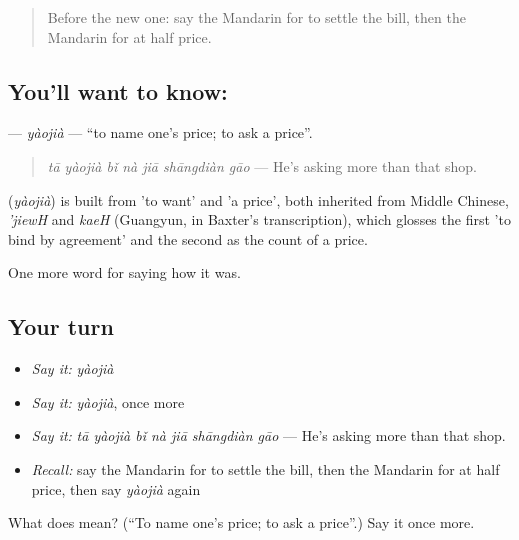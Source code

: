 \label{lesson:ZH-C524-yaojia}



\begin{quote}
Before the new one: say the Mandarin for to settle the bill, then the Mandarin for at half price.
\end{quote}

\subsection*{You'll want to know: }
\textbf{} — \emph{yàojià} — \textquotedblleft{}to name one's price; to ask a price\textquotedblright{}.

\begin{quote}
\emph{tā yàojià bǐ nà jiā shāngdiàn gāo} — He's asking more than that shop.
\end{quote}

\begin{cousinweb}
\textbf{} (\emph{yàojià}) is built from  'to want' and  'a price', both inherited from Middle Chinese, \emph{'jiewH} and \emph{kaeH} (Guangyun, in Baxter's transcription), which glosses the first 'to bind by agreement' and the second as the count of a price.
\end{cousinweb}

\begin{grammarlens}[title={What you've built}]
One more word for saying how it was.
\end{grammarlens}

\subsection*{Your turn}
\begin{itemize}
\raggedright
  \item \emph{Say it:} \emph{yàojià}
  \item \emph{Say it:} \emph{yàojià}, once more
  \item \emph{Say it:} \emph{tā yàojià bǐ nà jiā shāngdiàn gāo} — He's asking more than that shop.
  \item \emph{Recall:} say the Mandarin for to settle the bill, then the Mandarin for at half price, then say \emph{yàojià} again
\end{itemize}

\begin{tcolorbox}[breakable,colback=teal!4,colframe=teal!35!black,title={Before you move on}]
What does  mean? (\textquotedblleft{}To name one's price; to ask a price\textquotedblright{}.) Say it once more.
\end{tcolorbox}
